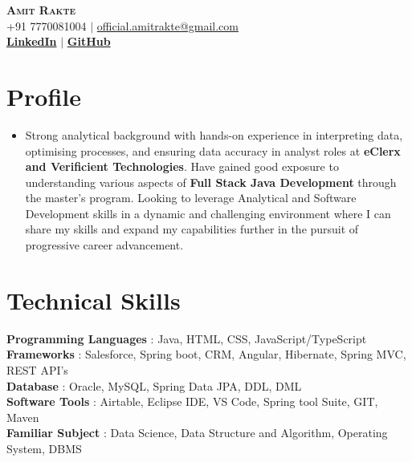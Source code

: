 \documentclass[letterpaper,11pt]{article}
\begin{document}
\begin{center}
    \textbf{\Huge \scshape Amit Rakte} \\ \vspace{1pt}
    \small +91 7770081004 $|$ \href{official.amitrakte@gmail.com}{{official.amitrakte@gmail.com}}    \\ 
    \small  \href{http://linkedin.com/in/amitrakte/}{\bf LinkedIn} $|$
    \href{http://github.com/Ameet-Rakte}{\bf GitHub} 
    
\end{center}

\section{Profile}
\begin{itemize}[leftmargin=0.15in, label={}]
\item 
Strong analytical background with hands-on experience in interpreting data, optimising processes, and ensuring data accuracy in analyst roles at \textbf{eClerx and Verificient Technologies}. Have gained good exposure to understanding various aspects of \textbf{Full Stack Java Development} through the master’s program. Looking to leverage Analytical and Software Development skills in a dynamic and challenging environment where I can share my skills and expand my capabilities further in the pursuit of progressive career advancement.
\end{itemize}

\section{Technical Skills}
 \begin{itemize}[leftmargin=0.15in, label={}]
    \small{\item{
     \textbf{Programming Languages}{\hspace{0.2cm} : Java, HTML, CSS, JavaScript/TypeScript} \\
     \textbf{Frameworks}{\hspace{2.45cm} : Salesforce, Spring boot, CRM, Angular, Hibernate, Spring MVC, REST API’s } \\
     \textbf{Database}{\hspace{2.95cm} : Oracle, MySQL, Spring Data JPA, DDL, DML} \\
     \textbf{Software Tools}{\hspace{2cm} : Airtable, Eclipse IDE, VS Code, Spring tool Suite, GIT, Maven } \\
     \textbf{Familiar Subject}{\hspace{1.66cm} : Data Science, Data Structure and Algorithm, Operating System, DBMS}\\     
    }}
 \end{itemize}
\end{document}
